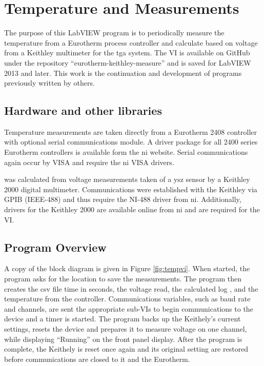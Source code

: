 \section{Temperature and  Measurements}
    \label{app:tgavi}
    The purpose of this LabVIEW program is to periodically measure the temperature from a Eurotherm process controller and calculate  based on voltage from a Keithley multimeter for the \gls{tga} system.
    The VI is available on GitHub under the repository ``eurotherm-keithley-measure'' and is saved for LabVIEW 2013 and later.
    This work is the continuation and development of programs previously written by others.

    \subsection{Hardware and other libraries}
    Temperature measurements are taken directly from a Eurotherm 2408 controller with optional serial communications module.
    A driver package for all 2400 series Eurotherm controllers is available form the \gls{ni} website.
    Serial communications again occur by VISA and require the \gls{ni} VISA drivers.

     was calculated from voltage measurements taken of a \gls{ysz} sensor by a Keithley 2000 digital multimeter.
    Communications were established with the Keithley via GPIB (IEEE-488) and thus require the NI-488 driver from \gls{ni}.
    Additionally, drivers for the Keithley 2000 are available online from \gls{ni} and are required for the VI.

    \subsection{Program Overview}
    A copy of the block diagram is given in Figure \ref{fig:tempvi}.
    When started, the program asks for the location to save the measurements.
    The program then creates the csv file time in seconds, the voltage read, the calculated log , and the temperature from the controller.
    Communications variables, such as baud rate and channels, are sent the appropriate sub-VIs to begin communications to the device and a timer is started.
    The program backs up the Keithely's current settings, resets the device and prepares it to measure voltage on one channel, while displaying ``Running'' on the front panel display.
    After the program is complete, the Keithely is reset once again and its original setting are restored before communications are closed to it and the Eurotherm.

